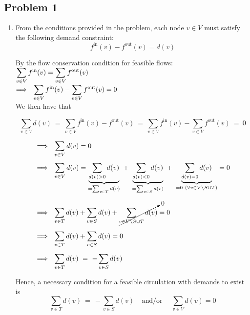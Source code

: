 \documentclass[twoside,11pt]{homework}
\date{\today}
\begin{document}
\maketitle

\subsection*{Problem 1}

\begin{enumerate}[\bf i.]

\item From the conditions provided in the problem, each node $v \in V$ must satisfy the following demand constraint:
$$ f^{\textrm{in}}(v) - f^{\textrm{out}}(v) = d(v)$$ 

By the flow conservation condition for feasible flows: \ $\mathlarger{\sum_{v \in V} f^{\textrm{in}}(v) = \sum_{v \in V} f^{\textrm{out}}(v)}$ \\[0.4em]
$ \Longrightarrow \ \ \mathlarger{\sum_{v \in V} f^{\textrm{in}}(v) - \sum_{v \in V} f^{\textrm{out}}(v) = 0}$ \\[0.4em]

We then have that

$$ \sum_{v \in V} d(v) \ = \ \sum_{v \in V} f^{\textrm{in}}(v) - f^{\textrm{out}}(v) \ = \ \sum_{v \in V} f^{\textrm{in}}(v) - \sum_{v \in V} f^{\textrm{out}}(v) \ = \ 0 $$

\begin{align*}
& \Longrightarrow \ \  \sum_{v \in V} d(v) = 0 \\[0.4em]
& \Longrightarrow \ \  \sum_{v \in V} d(v) = \underbrace{\sum_{d(v) > 0} d(v)}_{=\sum_{v\in T} d(v)} \ + \ \underbrace{\sum_{d(v) < 0} d(v)}_{=\sum_{v\in S} d(v)} \ + \ \underbrace{\sum_{d(v) = 0} d(v)}_{=0 \ (\forall v \in V \setminus S \cup T)} = 0 \\[0.7em]
& \Longrightarrow \ \ \sum_{v \in T} d(v) + \sum_{v \in S} d(v)  +  \cancelto{0}{\sum_{v \in V \setminus S \cup T} d(v)} = 0 \\[0.5em]
& \Longrightarrow \ \ \sum_{v \in T} d(v) + \sum_{v \in S} d(v) = 0 \\[0.5em]
& \Longrightarrow \ \ \sum_{v \in T} d(v) \ = \ - \sum_{v \in S} d(v)
\end{align*}

Hence, a necessary condition for a feasible circulation with demands to exist is 
$$\sum_{v \in T} d(v) \ = \ - \sum_{v \in S} d(v) \ \ \ \ \   \textrm{and/or} \ \ \ \ \ \   \sum_{v \in V} d(v) = 0$$ 


\end{enumerate}
\end{document}
